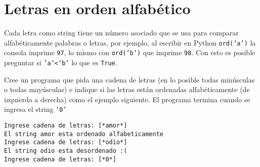 \section{Letras en orden alfabético}
Cada letra como string tiene un número asociado que se usa para comparar alfabéticamente palabras o letras, por ejemplo, al escribir en Python \texttt{ord('a')} la consola imprime \texttt{97}, lo mismo con \texttt{ord('b')} que imprime \texttt{98}. Con esto es posible preguntar si \texttt{'a'<'b'} lo que es \texttt{True}.

Cree un programa que pida una cadena de letras (en lo posible todas minúsculas o todas mayúsculas) e indique si las letras están ordenadas alfabéticamente (de izquierda a derecha) como el ejemplo siguiente. El programa termina cuando se ingresa el string \texttt{'0'}

\begin{lstlisting}[style=consola]
Ingrese cadena de letras: [*amor*]
El string amor esta ordenado alfabeticamente
Ingrese cadena de letras: [*odio*]
El string odio esta desordenado :(
Ingrese cadena de letras: [*0*]
\end{lstlisting}
